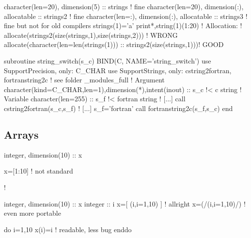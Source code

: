 \documentclass{article}
\begin{document}
\begin{codefull}
character(len=20), dimension(5)              :: strings  ! fine
character(len=20), dimension(:), allocatable :: strings2 ! fine 
character(len=:),  dimension(:), allocatable :: strings3 ! fine but not for old compilers
strings(1)='a'
print*,string(1)(1:20)
! Allocation: 
! allocate(strings2(size(strings,1),size(strings,2)))                ! WRONG
allocate(character(len=len(strings(1))) :: strings2(size(strings,1)))! GOOD
\end{codefull}\par 
\begin{codefull}
subroutine string_switch(s_c) BIND(C, NAME='string_switch')
    use SupportPrecision, only: C_CHAR
    use SupportStrings, only: cstring2fortran, fortranstring2c ! see folder _modules_full
    ! Argument
    character(kind=C_CHAR,len=1),dimension(*),intent(inout) :: s_c !< c string
    ! Variable
    character(len=255) :: s_f   !< fortran string
    ! [...]
    call cstring2fortran(s_c,s_f)
    ! [...]
    s_f='fortran'
    call fortranstring2c(s_f,s_c)
end 
\end{codefull}


\subsection{Arrays}
\label{sec:arrays}
\begin{codea}
integer, dimension(10) :: x

x=[1:10] ! not standard




!
\end{codea} 
\begin{codeb}
integer, dimension(10) :: x
integer :: i
x=[ (i,i=1,10) ] ! allright
x=(/(i,i=1,10)/) ! even more portable

do i=1,10
    x(i)=i ! readable, less bug
enddo
\end{codeb}
\end{document}
